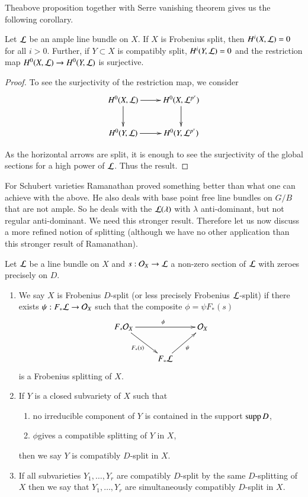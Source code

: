 The\pageoriginale above\label{page80} proposition together with Serre vanishing
theorem gives us the following corollary.

\begin{corollary}\label{coro-A.2.2}
Let $\mathcal{L}$ be an ample line bundle on $X$. If $X$ is Frobenius split,
then $H^{i}(X,\mathcal{L})=0$ for all $i>0$. Further, if $Y\subset X$ is
compatibly split, $H^{i}(Y,\mathcal{L})=0$ and the restriction map
$H^{0}(X,\mathcal{L})\to H^{0}(Y,\mathcal{L})$ is surjective.
\end{corollary}

\begin{proof}
To see the surjectivity of the restriction map, we consider
\[
\xymatrix{
H^{0}(X,\L)\ar[d]\ar[r] & H^{0}(X,\L^{p^{\nu}})\ar[d]\\
H^{0}(Y,\L)\ar[r] & H^{0}(Y,\L^{p^{\nu}})
}
\]

As the horizontal arrows are split, it is enough to see the
surjectivity of the global sections for a high power of $\mathcal{L}$. Thus the
result. 
\end{proof}

For Schubert varieties Ramanathan proved something better than what
one can achieve with the above. He also deals with base point free
line bundles on $G/B$ that are not ample. So he deals with the
$\mathcal{L}(\lambda)$ with $\lambda$ anti-dominant, but not regular
anti-dominant. We need this stronger result. Therefore let us now
discuss a more refined notion of splitting (although we have no other
application than this stronger result of Ramanathan).

\begin{definition}\label{defi-A.2.3}
Let $\mathcal{L}$ be a line bundle on $X$ and $s:\mathcal{O}_{X}\to \mathcal{L}$ a non-zero
section of $\mathcal{L}$ with zeroes precisely on $D$.
\begin{enumerate}
\item We say $X$ is Frobenius $D$-split (or less precisely Frobenius
  $\mathcal{L}$-split) if there exists $\psi:F_{\ast}\mathcal{L}\to \mathcal{O}_{X}$ such that
  the composite $\phi=\psi F_{\ast}(s)$
\[
\xymatrix{
F_{\ast}\O_{X}\ar[dr]_{F_{\ast}(s)} \ar[rr]^{\phi} & & \O_{X}\\
 & F_{\ast}\L\ar[ur]_{\psi} & 
}
\]
is a Frobenius splitting of $X$.

\item If $Y$ is a closed subvariety of $X$ such that
\begin{enumerate}
\renewcommand{\theenumii}{\roman{enumii}}
\renewcommand{\labelenumii}{(\theenumii)}
\item no irreducible component of $Y$ is contained in the support
  $\operatorname{supp} D$, 

\item $\phi$\pageoriginale gives\label{page81} a compatible splitting of $Y$ in $X$,
\end{enumerate}
then we say $Y$ is compatibly $D$-split in $X$.

\item If all subvarieties $Y_{1},\ldots,Y_{r}$ are compatibly
  $D$-split by the same $D$-splitting of $X$ then we say that
  $Y_{1},\ldots,Y_{r}$ are simultaneously compatibly $D$-split in $X$.
\end{enumerate}
\end{definition}

